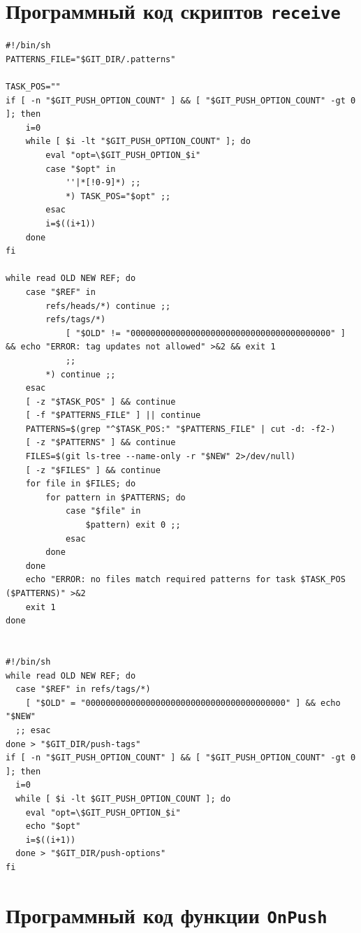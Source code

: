 \documentclass[coursework]{SCWorks}
\begin{document}
\section{Программный код скриптов \texttt{receive}}
\label{sec:scripts}

\begin{verbatim}
#!/bin/sh
PATTERNS_FILE="$GIT_DIR/.patterns"

TASK_POS=""
if [ -n "$GIT_PUSH_OPTION_COUNT" ] && [ "$GIT_PUSH_OPTION_COUNT" -gt 0 ]; then
    i=0
    while [ $i -lt "$GIT_PUSH_OPTION_COUNT" ]; do
        eval "opt=\$GIT_PUSH_OPTION_$i"
        case "$opt" in
            ''|*[!0-9]*) ;;
            *) TASK_POS="$opt" ;;
        esac
        i=$((i+1))
    done
fi

while read OLD NEW REF; do
    case "$REF" in
        refs/heads/*) continue ;;
        refs/tags/*)
            [ "$OLD" != "0000000000000000000000000000000000000000" ] && echo "ERROR: tag updates not allowed" >&2 && exit 1
            ;;
        *) continue ;;
    esac
    [ -z "$TASK_POS" ] && continue
    [ -f "$PATTERNS_FILE" ] || continue
    PATTERNS=$(grep "^$TASK_POS:" "$PATTERNS_FILE" | cut -d: -f2-)
    [ -z "$PATTERNS" ] && continue
    FILES=$(git ls-tree --name-only -r "$NEW" 2>/dev/null)
    [ -z "$FILES" ] && continue
    for file in $FILES; do
        for pattern in $PATTERNS; do
            case "$file" in
                $pattern) exit 0 ;;
            esac
        done
    done
    echo "ERROR: no files match required patterns for task $TASK_POS ($PATTERNS)" >&2
    exit 1
done


#!/bin/sh
while read OLD NEW REF; do
  case "$REF" in refs/tags/*)
    [ "$OLD" = "0000000000000000000000000000000000000000" ] && echo "$NEW"
  ;; esac
done > "$GIT_DIR/push-tags"
if [ -n "$GIT_PUSH_OPTION_COUNT" ] && [ "$GIT_PUSH_OPTION_COUNT" -gt 0 ]; then
  i=0
  while [ $i -lt $GIT_PUSH_OPTION_COUNT ]; do
    eval "opt=\$GIT_PUSH_OPTION_$i"
    echo "$opt"
    i=$((i+1))
  done > "$GIT_DIR/push-options"
fi

\end{verbatim}

\section{Программный код функции \texttt{OnPush}}
\label{sec:OnPush}
\end{document}
